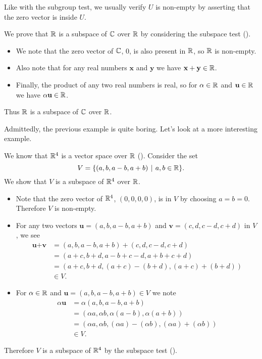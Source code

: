\begin{remark}
    Like with the subgroup test, we usually verify $U$ is non-empty by asserting that the zero vector is inside $U$.
\end{remark}

\begin{example}
    We prove that $\mathbb{R}$ is a subspace of $\mathbb{C}$ over $\mathbb{R}$ by considering the subspace test ().
    \begin{itemize}
        \item We note that the zero vector of $\mathbb{C}$, 0, is also present in $\mathbb{R}$, so $\mathbb{R}$ is non-empty.
        \item Also note that for any real numbers $\textbf{x}$ and $\textbf{y}$ we have $\textbf{x} + \textbf{y} \in \mathbb{R}$.
        \item Finally, the product of any two real numbers is real, so for $\alpha \in \mathbb{R}$ and $\textbf{u} \in \mathbb{R}$ we have $\alpha\textbf{u} \in \mathbb{R}$.
    \end{itemize}
    Thus $\mathbb{R}$ is a subspace of $\mathbb{C}$ over $\mathbb{R}$.
\end{example}

Admittedly, the previous example is quite boring. Let's look at a more interesting example.
\begin{example}
    We know that $\mathbb{R}^4$ is a vector space over $\mathbb{R}$ (). Consider the set
    \[
        V = \{(a, b, a-b, a+b) \vert a, b \in \R\}.
    \]
    We show that $V$ is a subspace of $\mathbb{R}^4$ over $\mathbb{R}$.
    \begin{itemize}
        \item Note that the zero vector of $\mathbb{R}^4$, $(0,0,0,0)$, is in $V$ by choosing $a = b = 0$. Therefore $V$ is non-empty.
        \item For any two vectors $\textbf{u} = (a, b, a-b, a+b)$ and $\textbf{v} = (c, d, c-d, c+d)$ in $V$, we see
        \begin{align*}
            \textbf{u} + \textbf{v} &= (a, b, a-b, a+b) + (c, d, c-d, c+d)\\
            &= (a + c, b + d, a - b + c - d, a + b + c + d)\\
            &= (a+c, b+d, (a+c)-(b+d), (a+c)+(b+d))\\
            &\in V.
        \end{align*}
        \item For $\alpha \in \mathbb{R}$ and $\textbf{u} = (a, b, a-b, a+b) \in V$ we note
        \begin{align*}
            \alpha\textbf{u} &= \alpha(a, b, a-b, a+b)\\
            &= (\alpha a, \alpha b, \alpha(a-b), \alpha(a+b))\\
            &= (\alpha a, \alpha b, (\alpha a) - (\alpha b), (\alpha a) + (\alpha b))\\
            &\in V.
        \end{align*}
    \end{itemize}
    Therefore $V$ is a subspace of $\mathbb{R}^4$ by the subspace test ().
\end{example}

